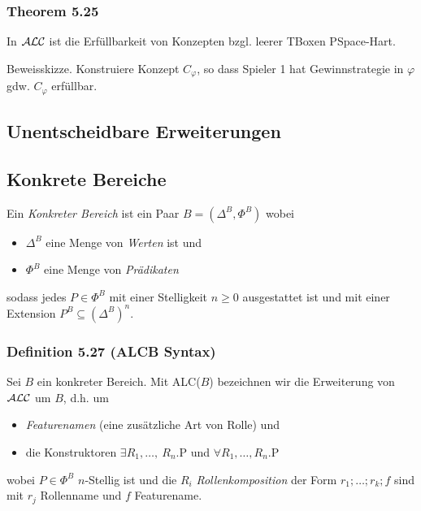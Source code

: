 \subsubsection{Theorem 5.25}\label{theorem-5.25}

In $\mathcal{A}\mathcal{L}\mathcal{C}$ ist die Erfüllbarkeit von Konzepten bzgl. leerer TBoxen
PSpace-Hart.

Beweisskizze. Konstruiere Konzept $C_{\varphi}$, so dass Spieler 1 hat
Gewinnstrategie in $\varphi$ gdw. $C_{\varphi}$ erfüllbar.

\subsection{Unentscheidbare
Erweiterungen}\label{unentscheidbare-erweiterungen}

\subsection{Konkrete Bereiche}\label{konkrete-bereiche}

Ein \emph{Konkreter Bereich} ist ein Paar $B = (\Delta^{B},\Phi^{B})$
wobei

\begin{itemize}
\item
  $\Delta^{B}$ eine Menge von \emph{Werten} ist und
\item
  $\Phi^{B}$ eine Menge von \emph{Prädikaten}
\end{itemize}

sodass jedes $P \in \Phi^{B}$ mit einer Stelligkeit $n \geq 0$
ausgestattet ist und mit einer Extension
$P^{B} \subseteq \left( \Delta^{B} \right)^{n}$.

\subsubsection{Definition 5.27 (ALCB
Syntax)}\label{definition-5.27-alcb-syntax}

Sei $B$ ein konkreter Bereich. Mit ALC($B$) bezeichnen wir die
Erweiterung von $\mathcal{A}\mathcal{L}\mathcal{C}$ um $B$, d.h. um

\begin{itemize}
\item
  \emph{Featurenamen} (eine zusätzliche Art von Rolle) und
\item
  die Konstruktoren $\exists R_{1},\ldots,\ R_{n}\text{.P}$ und
  $\forall R_{1},\ldots,R_{n}\text{.P}$
\end{itemize}

wobei $P \in \Phi^{B}$ $n$-Stellig ist und die $R_{i}$
\emph{Rollenkomposition} der Form $r_{1};\ldots;r_{k};f$ sind mit
$r_{j}$ Rollenname und $f$ Featurename.

